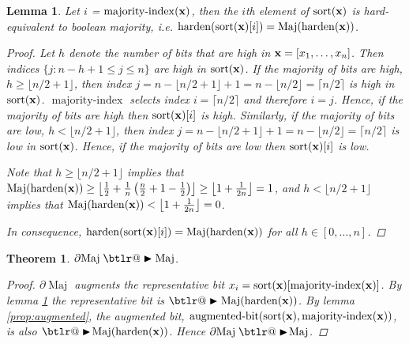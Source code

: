 \documentclass{article} %
\makeatletter
\newtheorem{theorem}{Theorem}
\newtheorem{lemma}{Lemma}
\DeclareRobustCommand{\btright}{\mathrel{\mathpalette\btlr@\blacktriangleright}}
\newcommand{\btlr@}[2]{%
	\begingroup
	\sbox\z@{$\m@th#1\triangleright$}%
	\sbox\tw@{\resizebox{1.1\wd\z@}{1.1\ht\z@}{\raisebox{\depth}{$\m@th#1\mkern-1mu#2$}}}%
	\ht\tw@=\ht\z@ \dp\tw@=\dp\z@ \wd\tw@=\wd\z@
	\copy\tw@
	\endgroup
}
\makeatother
\begin{document}
\begin{lemma}
\label{lem:maj}
Let $i$ = $\operatorname{majority-index}({\bf x})$, then the $i$th element of $\operatorname{sort}({\bf x})$ is hard-equivalent to boolean majority, i.e. $\operatorname{harden}(\operatorname{sort}({\bf x})[i]) = \operatorname{Maj}(\operatorname{harden}({\bf x}))$.
\begin{proof}
Let $h$ denote the number of bits that are high in ${\bf x} = [x_{1}, \dots, x_{n}]$. Then indices $\{j : n-h+1 \leq j \leq n\}$ are high in $\operatorname{sort}({\bf x})$. If the majority of bits are high, $h \geq \lfloor n/2 + 1 \rfloor$, then index $j=n - \lfloor n/2 + 1 \rfloor + 1 = n - \lfloor n/2 \rfloor = \lceil n/2 \rceil$ is high in $\operatorname{sort}({\bf x})$. $\operatorname{majority-index}$ selects index $i = \lceil n/2 \rceil$ and therefore $i=j$. Hence, if the majority of bits are high then $\operatorname{sort}({\bf x})[i]$ is high. Similarly, if the majority of bits are low, $h < \lfloor n/2 + 1 \rfloor$, then index $j=n - \lfloor n/2 + 1 \rfloor + 1 = n - \lfloor n/2 \rfloor = \lceil n/2 \rceil$ is low in $\operatorname{sort}({\bf x})$. Hence, if the majority of bits are low then $\operatorname{sort}({\bf x})[i]$ is low.

Note that $h \geq \lfloor n/2 + 1 \rfloor$ implies that $\operatorname{Maj}(\operatorname{harden}({\bf x})) \geq \left\lfloor \frac{1}{2} + \frac{1}{n}\left(\frac{n}{2} + 1 - \frac{1}{2} \right) \right\rfloor \geq \left\lfloor 1 + \frac{1}{2n} \right\rfloor = 1$, and $h < \lfloor n/2 + 1 \rfloor$ implies that $\operatorname{Maj}(\operatorname{harden}({\bf x})) < \left\lfloor 1 + \frac{1}{2n} \right\rfloor = 0$.

In consequence, $\operatorname{harden}(\operatorname{sort}({\bf x})[i]) = \operatorname{Maj}(\operatorname{harden}({\bf x}))$ for all $h \in [0,\dots, n]$.
\end{proof}
\end{lemma}

\begin{theorem}\label{prop:majority}
	$\partial\!\operatorname{Maj} \btright \operatorname{Maj}$.
\begin{proof}
	$\partial\!\operatorname{Maj}$ augments the representative bit $x_{i} = \operatorname{sort}({\bf x})[\operatorname{majority-index}({\bf x})]$. By lemma \ref{lem:maj} the representative bit is $\btright \operatorname{Maj}(\operatorname{harden}({\bf x}))$.
    By lemma \ref{prop:augmented}, the augmented bit, $\operatorname{augmented-bit}(\operatorname{sort}({\bf x}), \operatorname{majority-index}({\bf x}))$, is also $\btright\!\operatorname{Maj}(\operatorname{harden}({\bf x}))$. Hence $\partial\!\operatorname{Maj} \btright\!\operatorname{Maj}$.
\end{proof}
\end{theorem}
\end{document}
